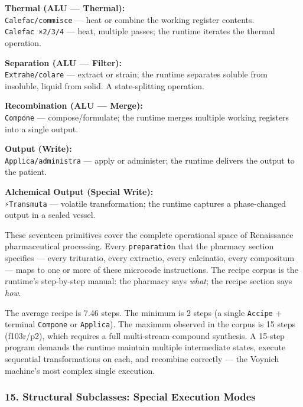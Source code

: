 \documentclass[12pt,a4paper]{article}
\begin{document}
\textbf{Thermal (ALU --- Thermal):}\\
\texttt{Calefac/commisce} --- heat or combine the working register
contents.\\
\texttt{Calefac\ ×2/3/4} --- heat, multiple passes; the runtime iterates
the thermal operation.

\textbf{Separation (ALU --- Filter):}\\
\texttt{Extrahe/colare} --- extract or strain; the runtime separates
soluble from insoluble, liquid from solid. A state-splitting operation.

\textbf{Recombination (ALU --- Merge):}\\
\texttt{Compone} --- compose/formulate; the runtime merges multiple
working registers into a single output.

\textbf{Output (Write):}\\
\texttt{Applica/administra} --- apply or administer; the runtime
delivers the output to the patient.

\textbf{Alchemical Output (Special Write):}\\
\texttt{⚡Transmuta} --- volatile transformation; the runtime captures a
phase-changed output in a sealed vessel.

These seventeen primitives cover the complete operational space of
Renaissance pharmaceutical processing. Every \texttt{preparatio}n that
the pharmacy section specifies --- every trituratio, every extractio,
every calcinatio, every compositum --- maps to one or more of these
microcode instructions. The recipe corpus is the runtime's step-by-step
manual: the pharmacy says \emph{what}; the recipe section says
\emph{how}.

The average recipe is 7.46 steps. The minimum is 2 steps (a single
\texttt{Accipe} + terminal \texttt{Compone} or \texttt{Applica}). The
maximum observed in the corpus is 15 steps (f103r/p2), which requires a
full multi-stream compound synthesis. A 15-step program demands the
runtime maintain multiple intermediate states, execute sequential
transformations on each, and recombine correctly --- the Voynich
machine's most complex single execution.

\hypertarget{structural-subclasses-special-execution-modes}{%
\subsubsection{15. Structural Subclasses: Special Execution
Modes}\label{structural-subclasses-special-execution-modes}}
\end{document}
